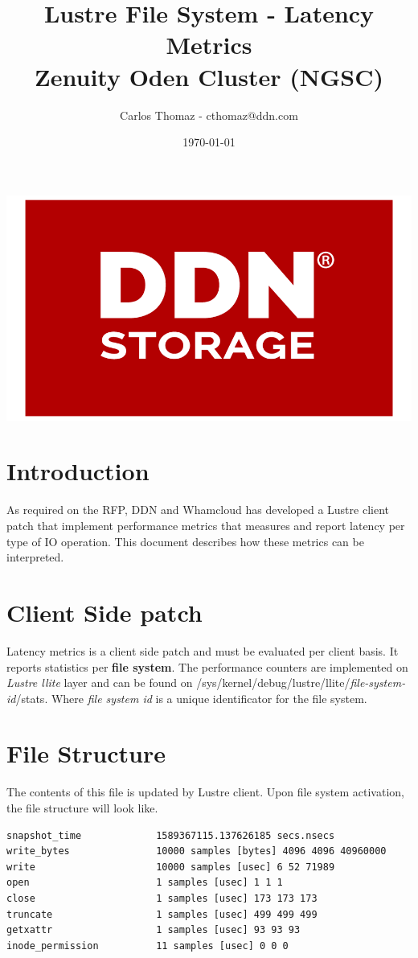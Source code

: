 \documentclass{article}
\title{%
Lustre File System - Latency Metrics \\
\large Zenuity Oden Cluster (NGSC)}
\author{Carlos Thomaz - cthomaz@ddn.com}
\date{\today}
\begin{document}
\maketitle


\begin{center}
    \includegraphics[scale=0.14]{logo.png}\\[1cm] 
\end{center}

\newpage

\begin{versionhistory}
\end{versionhistory}


\newpage
\section{Introduction}
As required on the RFP, DDN and Whamcloud has developed a Lustre client patch that implement performance metrics that measures and report latency per type of IO operation. This document describes how these metrics can be interpreted.

\section{Client Side patch}
Latency metrics is a client side patch and must be evaluated per client basis. It reports statistics per \textbf{file system}. The performance counters are implemented on \textit{Lustre llite} layer and can be found on /sys/kernel/debug/lustre/llite/\textit{file-system-id}/stats. Where \textit{file system id} is a unique identificator for the file system.

\section{File Structure}
The contents of this file is updated by Lustre client. Upon file system activation, the file structure will look like.
\begin{verbatim}
snapshot_time             1589367115.137626185 secs.nsecs
write_bytes               10000 samples [bytes] 4096 4096 40960000
write                     10000 samples [usec] 6 52 71989
open                      1 samples [usec] 1 1 1
close                     1 samples [usec] 173 173 173
truncate                  1 samples [usec] 499 499 499
getxattr                  1 samples [usec] 93 93 93
inode_permission          11 samples [usec] 0 0 0
\end{verbatim}
\end{document}
